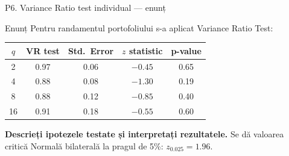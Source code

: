 \documentclass[9pt, aspectratio=169, t]{beamer}
\begin{document}
\begin{frame}{P6. Variance Ratio test individual --- enunț}
\begin{block}{Enunț}
Pentru randamentul portofoliului s-a aplicat Variance Ratio Test:
\begin{center}\small
\begin{tabular}{ccccc}\toprule
$q$ & VR test & Std.\ Error & $z$ statistic & p-value\\\midrule
2  & 0.97 & 0.06 & $-0.45$ & 0.65\\
4  & 0.88 & 0.08 & $-1.30$ & 0.19\\
8  & 0.88 & 0.12 & $-0.85$ & 0.40\\
16 & 0.91 & 0.18 & $-0.55$ & 0.60\\\bottomrule
\end{tabular}
\end{center}
\textbf{Descrieți ipotezele testate și interpretați rezultatele.} Se dă valoarea critică Normală bilaterală la pragul de 5\%: $z_{0.025} = 1.96$.
\end{block}
\end{frame}
\end{document}
